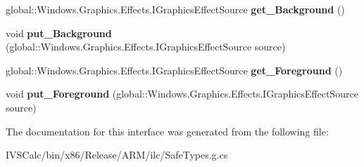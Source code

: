 \begin{DoxyCompactItemize}
\mbox{\label{interface_microsoft_1_1_graphics_1_1_canvas_1_1_effects_1_1_i_blend_effect_a9bf514b43e36b2488c8d53157b276ac0}} 
global\+::\+Windows.\+Graphics.\+Effects.\+I\+Graphics\+Effect\+Source {\bfseries get\+\_\+\+Background} ()
\item 
\mbox{\label{interface_microsoft_1_1_graphics_1_1_canvas_1_1_effects_1_1_i_blend_effect_a16dda1810dcd399600c55e24b03baa2c}} 
void {\bfseries put\+\_\+\+Background} (global\+::\+Windows.\+Graphics.\+Effects.\+I\+Graphics\+Effect\+Source source)
\item 
\mbox{\label{interface_microsoft_1_1_graphics_1_1_canvas_1_1_effects_1_1_i_blend_effect_a27971086ad5738eee6bc56e8fa2047a8}} 
global\+::\+Windows.\+Graphics.\+Effects.\+I\+Graphics\+Effect\+Source {\bfseries get\+\_\+\+Foreground} ()
\item 
\mbox{\label{interface_microsoft_1_1_graphics_1_1_canvas_1_1_effects_1_1_i_blend_effect_a9bc8bd434ced7607b3252e64f0a1cf9f}} 
void {\bfseries put\+\_\+\+Foreground} (global\+::\+Windows.\+Graphics.\+Effects.\+I\+Graphics\+Effect\+Source source)
\end{DoxyCompactItemize}


The documentation for this interface was generated from the following file\+:\begin{DoxyCompactItemize}
\item 
I\+V\+S\+Calc/bin/x86/\+Release/\+A\+R\+M/ilc/Safe\+Types.\+g.\+cs\end{DoxyCompactItemize}
